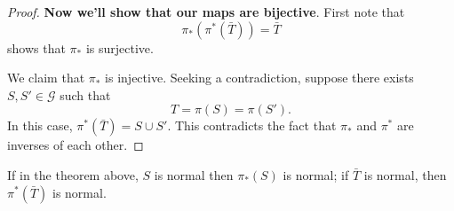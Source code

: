 \documentclass{ximera}
\begin{document}
\begin{theorem}
\begin{proof}
    \textbf{Now we'll show that our maps are bijective}. First note
    that
    \[
    \pi_*(\pi^*(\bar{T})) = \bar{T}
    \]
    shows that $\pi_*$ is surjective.

    We claim that $\pi_*$ is injective. Seeking a contradiction,
    suppose there exists $S,S'\in \mathcal{G}$ such that
    \[
    T = \pi(S) =\pi(S').
    \]
    In this case, $\pi^*(\bar T) = S\cup S'$. This contradicts the
    fact that $\pi_*$ and $\pi^*$ are inverses of each other.
  \end{proof}
\end{theorem}


\begin{corollary}
  If in the theorem above, $S$ is normal then $\pi_*(S)$ is normal; if
  $\bar{T}$ is normal, then $\pi^*(\bar{T})$ is normal.
\end{corollary}
\end{document}
